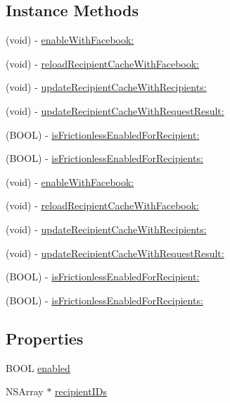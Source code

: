 \subsection*{Instance Methods}
\begin{DoxyCompactItemize}
\item 
(void) -\/ \hyperlink{interfaceFBFrictionlessRequestSettings_a20d87a686eed0f68e9652ed8174b2c0a}{enable\+With\+Facebook\+:}
\item 
(void) -\/ \hyperlink{interfaceFBFrictionlessRequestSettings_a0c4d88424b70a57d67f13a6140df0ed8}{reload\+Recipient\+Cache\+With\+Facebook\+:}
\item 
(void) -\/ \hyperlink{interfaceFBFrictionlessRequestSettings_a89765043524729eb121183335b27b686}{update\+Recipient\+Cache\+With\+Recipients\+:}
\item 
(void) -\/ \hyperlink{interfaceFBFrictionlessRequestSettings_a3c58d8dd6a73405f439ed0325ab827d6}{update\+Recipient\+Cache\+With\+Request\+Result\+:}
\item 
(B\+O\+OL) -\/ \hyperlink{interfaceFBFrictionlessRequestSettings_afadc17cbaedfd540100cfcf6d5ce268c}{is\+Frictionless\+Enabled\+For\+Recipient\+:}
\item 
(B\+O\+OL) -\/ \hyperlink{interfaceFBFrictionlessRequestSettings_a2f9cda6322525f7f0dfe3291a65e963e}{is\+Frictionless\+Enabled\+For\+Recipients\+:}
\item 
(void) -\/ \hyperlink{interfaceFBFrictionlessRequestSettings_a20d87a686eed0f68e9652ed8174b2c0a}{enable\+With\+Facebook\+:}
\item 
(void) -\/ \hyperlink{interfaceFBFrictionlessRequestSettings_a0c4d88424b70a57d67f13a6140df0ed8}{reload\+Recipient\+Cache\+With\+Facebook\+:}
\item 
(void) -\/ \hyperlink{interfaceFBFrictionlessRequestSettings_a89765043524729eb121183335b27b686}{update\+Recipient\+Cache\+With\+Recipients\+:}
\item 
(void) -\/ \hyperlink{interfaceFBFrictionlessRequestSettings_a3c58d8dd6a73405f439ed0325ab827d6}{update\+Recipient\+Cache\+With\+Request\+Result\+:}
\item 
(B\+O\+OL) -\/ \hyperlink{interfaceFBFrictionlessRequestSettings_afadc17cbaedfd540100cfcf6d5ce268c}{is\+Frictionless\+Enabled\+For\+Recipient\+:}
\item 
(B\+O\+OL) -\/ \hyperlink{interfaceFBFrictionlessRequestSettings_a2f9cda6322525f7f0dfe3291a65e963e}{is\+Frictionless\+Enabled\+For\+Recipients\+:}
\end{DoxyCompactItemize}
\subsection*{Properties}
\begin{DoxyCompactItemize}
\item 
B\+O\+OL \hyperlink{interfaceFBFrictionlessRequestSettings_aeed84a79e1c4fbb28c6ff3ce1702e479}{enabled}
\item 
N\+S\+Array $\ast$ \hyperlink{interfaceFBFrictionlessRequestSettings_adf23a29dc2c07277762cbacf5c5a21a8}{recipient\+I\+Ds}
\end{DoxyCompactItemize}


